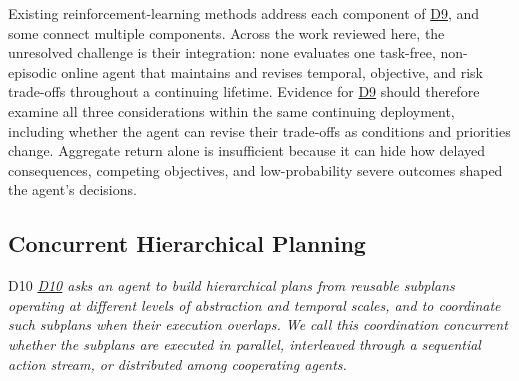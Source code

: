 \documentclass[10pt,journal,compsoc]{IEEEtran}
\DeclareRobustCommand{\Dref}[1]{\hyperref[sec:d#1]{D#1}}
\begin{document}
Existing reinforcement-learning methods address each component of \Dref{9}, and some connect multiple components.
Across the work reviewed here, the unresolved challenge is their integration: none evaluates one task-free, non-episodic online agent that maintains and revises temporal, objective, and risk trade-offs throughout a continuing lifetime.
Evidence for \Dref{9} should therefore examine all three considerations within the same continuing deployment, including whether the agent can revise their trade-offs as conditions and priorities change.
Aggregate return alone is insufficient because it can hide how delayed consequences, competing objectives, and low-probability severe outcomes shaped the agent's decisions.

\subsection{Concurrent Hierarchical Planning}
\label{sec:d10}

\begin{briefbox}[behaviorbrief]{D10}
    \emph{\Dref{10} asks an agent to build hierarchical plans from reusable subplans operating at different levels of abstraction and temporal scales, and to coordinate such subplans when their execution overlaps.
    We call this coordination concurrent whether the subplans are executed in parallel, interleaved through a sequential action stream, or distributed among cooperating agents.}
\end{briefbox}
\end{document}
